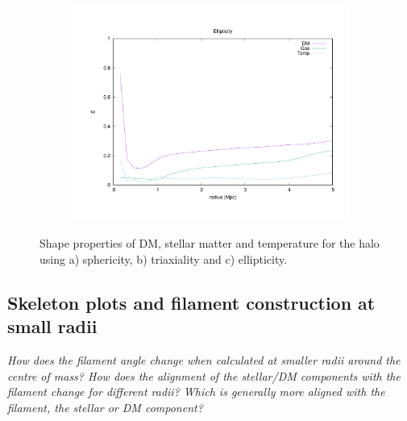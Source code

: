 \documentclass[journal]{IEEEtran}
\begin{document}
\begin{figure}[!t]
\begin{subfigure}[t]{0.3\textwidth}
	\end{subfigure}
	\quad
	\begin{subfigure}[t]{0.3\textwidth}
		\centering
		\includegraphics[width=\linewidth]{Ellipticity}
	\end{subfigure}
\label{fig:shapes}
	\caption{Shape properties of DM, stellar matter and temperature for the halo using a) sphericity, b) triaxiality and c) ellipticity.}
\end{figure}

\subsection{Skeleton plots and filament construction at small radii}
\textit{How does the filament angle change when calculated at smaller radii around the centre of mass?
How does the alignment of the stellar/DM components with the filament change for different radii?
Which is generally more aligned with the filament, the stellar or DM component?}
\end{document}
